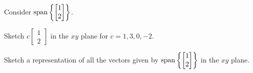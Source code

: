 \begin{applicationActivities}{2}{8}
\begin{activity}{10}
  Consider \(\operatorname{span}\left\{\begin{bmatrix}1\\2\end{bmatrix}\right\}\).
  \begin{subactivity}
    Sketch
    \(c\begin{bmatrix}1\\2\end{bmatrix}\) in the \(xy\) plane
    for \(c=1,3,0,-2\).
  \end{subactivity}
  \begin{subactivity}
    Sketch a representation of all the vectors given by
    \(\operatorname{span}\left\{\begin{bmatrix}1\\2\end{bmatrix}\right\}\)
    in the \(xy\) plane.
  \end{subactivity}
\end{activity}


\end{applicationActivities}
